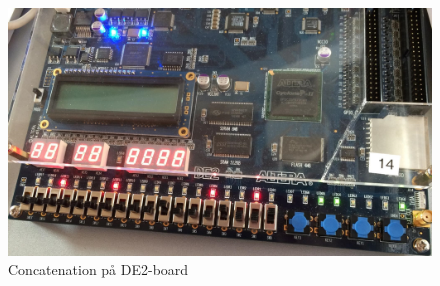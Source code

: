 \begin{enumerate}
	\begin{figure}[H]
		\centering
		\includegraphics[scale=0.23]{pictures/Oevelse3/Concatenation_DE2board.jpg}
		\caption{Concatenation på DE2-board}
		\label{fig:concatenation_DE2board}
	\end{figure}

\end{enumerate}

